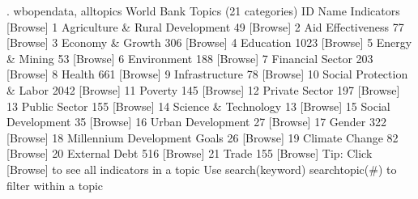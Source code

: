 . wbopendata, alltopics
{\smallskip}
World Bank Topics (21 categories)
  ID  Name                                         Indicators  [Browse]
   1  Agriculture \& Rural Development                      49  [Browse]
   2  Aid Effectiveness                                    77  [Browse]
   3  Economy \& Growth                                    306  [Browse]
   4  Education                                          1023  [Browse]
   5  Energy \& Mining                                      53  [Browse]
   6  Environment                                         188  [Browse]
   7  Financial Sector                                    203  [Browse]
   8  Health                                              661  [Browse]
   9  Infrastructure                                       78  [Browse]
  10  Social Protection \& Labor                          2042  [Browse]
  11  Poverty                                             145  [Browse]
  12  Private Sector                                      197  [Browse]
  13  Public Sector                                       155  [Browse]
  14  Science \& Technology                                 13  [Browse]
  15  Social Development                                   35  [Browse]
  16  Urban Development                                    27  [Browse]
  17  Gender                                              322  [Browse]
  18  Millennium Development Goals                         26  [Browse]
  19  Climate Change                                       82  [Browse]
  20  External Debt                                       516  [Browse]
  21  Trade                                               155  [Browse]
{\smallskip}
Tip: Click [Browse] to see all indicators in a topic
     Use search(keyword) searchtopic(\#) to filter within a topic
